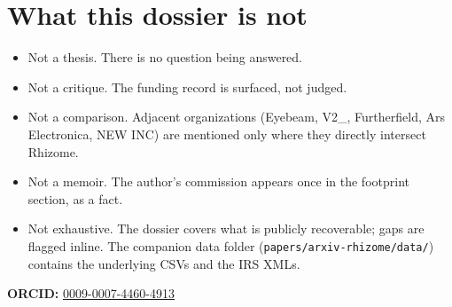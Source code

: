 \documentclass[10pt,letterpaper,twocolumn]{article}
\begin{document}
\section{What this dossier is not}

\begin{itemize}
  \item Not a thesis. There is no question being answered.
  \item Not a critique. The funding record is surfaced, not judged.
  \item Not a comparison. Adjacent organizations (Eyebeam, V2\_, Furtherfield, Ars Electronica, NEW INC) are mentioned only where they directly intersect Rhizome.
  \item Not a memoir. The author's commission appears once in the footprint section, as a fact.
  \item Not exhaustive. The dossier covers what is publicly recoverable; gaps are flagged inline. The companion data folder (\texttt{papers/arxiv-rhizome/data/}) contains the underlying CSVs and the IRS XMLs.
\end{itemize}

\vspace{0.5em}
\noindent\textbf{ORCID:} \href{https://orcid.org/0009-0007-4460-4913}{0009-0007-4460-4913}



\end{document}
